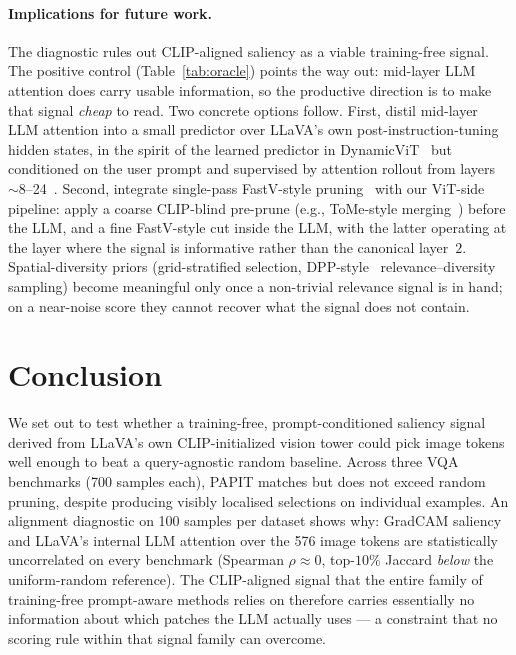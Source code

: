 \documentclass[10pt,twocolumn,letterpaper]{article}
\begin{document}
\paragraph{Implications for future work.}
The diagnostic rules out CLIP-aligned saliency as a viable
training-free signal. The positive control (Table~\ref{tab:oracle})
points the way out: mid-layer LLM attention does carry usable
information, so the productive direction is to make that signal
\emph{cheap} to read. Two concrete options follow. First, distil
mid-layer LLM attention into a small predictor over LLaVA's own
post-instruction-tuning hidden states, in the spirit of the learned
predictor in DynamicViT~\cite{rao2021dynamicvit} but conditioned on
the user prompt and supervised by attention rollout from
layers~$\sim$8--24~\cite{abnar2020rollout}. Second, integrate
single-pass FastV-style pruning~\cite{chen2024fastv} with our
ViT-side pipeline: apply a coarse CLIP-blind pre-prune (e.g.,
ToMe-style merging~\cite{bolya2023tome}) before the LLM, and a
fine FastV-style cut inside the LLM, with the latter operating at
the layer where the signal is informative rather than the canonical
layer~$2$. Spatial-diversity priors (grid-stratified
selection, DPP-style~\cite{kulesza2012dpp} relevance--diversity
sampling) become meaningful only once a non-trivial relevance signal
is in hand; on a near-noise score they cannot recover what the
signal does not contain.

\section{Conclusion}

We set out to test whether a training-free, prompt-conditioned
saliency signal derived from LLaVA's own CLIP-initialized vision
tower could pick image tokens well enough to beat a query-agnostic
random baseline. Across three VQA benchmarks (700 samples each),
PAPIT matches but does not exceed random pruning, despite producing
visibly localised selections on individual examples. An alignment
diagnostic on 100 samples per dataset shows why: GradCAM saliency
and LLaVA's internal LLM attention over the 576 image tokens are
statistically uncorrelated on every benchmark (Spearman
$\rho \approx 0$, top-$10\%$ Jaccard \emph{below} the uniform-random
reference). The CLIP-aligned signal that the entire family of
training-free prompt-aware methods relies on therefore carries
essentially no information about which patches the LLM actually uses
--- a constraint that no scoring rule within that signal family
can overcome.
\end{document}
